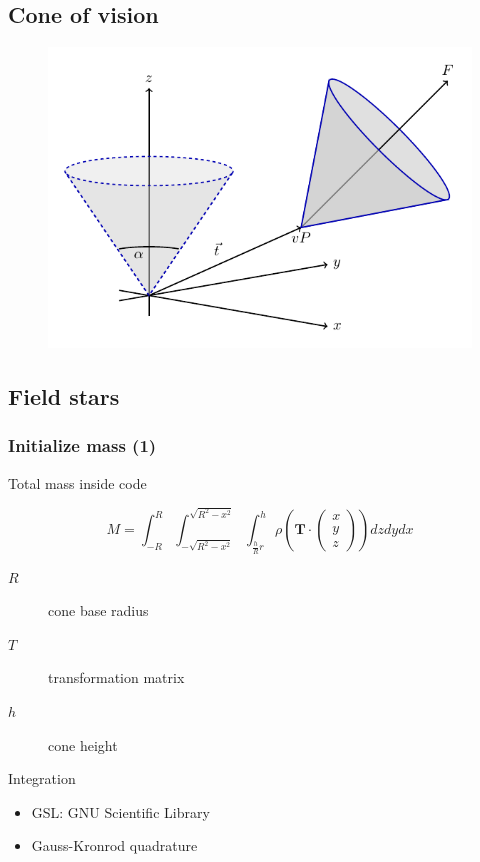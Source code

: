 \documentclass{beamer}
\begin{document}
\subsection{Cone of vision}

\begin{frame}
\begin{figure}
\centering
\includegraphics[width=0.9\linewidth]{Images/cone.pdf}
\end{figure}
\end{frame}


\subsection{Field stars}

\begin{frame}
\frametitle{Initialize mass (1)}
 Total mass inside code

\begin{equation*}
M = \int_{-R}^{R}\int_{-\sqrt{R^2-x^2}}^{\sqrt{R^2-x^2}}\int_{\frac{h}{R}r}^{h} \rho \left ( \mathbf{T} \cdot \begin{pmatrix}x\\ y\\ z\end{pmatrix} \right ) dzdydx
\end{equation*}

\begin{description}
\item[\(R\)] cone base radius
\item[\(T\)] transformation matrix
\item[\(h\)] cone height
\end{description}

Integration

\begin{itemize}
\item GSL: GNU Scientific Library
\item Gauss-Kronrod quadrature
\end{itemize}

\end{frame}
\end{document}
